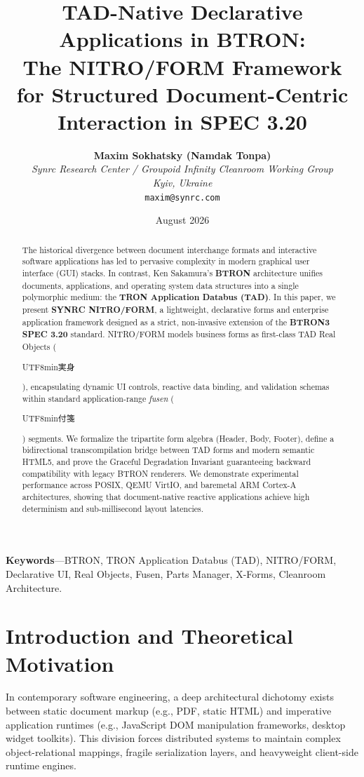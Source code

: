 \documentclass[10pt,journal,compsoc,twocolumn]{article}
\title{\LARGE \textbf{TAD-Native Declarative Applications in BTRON:\\The NITRO/FORM Framework for Structured Document-Centric Interaction in SPEC 3.20}}
\author{
    \textbf{Maxim Sokhatsky (Namdak Tonpa)}\\[0.3em]
    \small \textit{Synrc Research Center / Groupoid Infinity Cleanroom Working Group}\\
    \small \textit{Kyiv, Ukraine}\\
    \small \texttt{maxim@synrc.com}
}
\date{August 2026}
\newcommand{\ja}[1]{\begin{CJK*}{UTF8}{min}#1\end{CJK*}}
\begin{document}
\maketitle

\begin{abstract}
The historical divergence between document interchange formats and interactive software applications has led to pervasive complexity in modern graphical user interface (GUI) stacks. In contrast, Ken Sakamura's \textbf{BTRON} architecture unifies documents, applications, and operating system data structures into a single polymorphic medium: the \textbf{TRON Application Databus (TAD)}. In this paper, we present \textbf{SYNRC NITRO/FORM}, a lightweight, declarative forms and enterprise application framework designed as a strict, non-invasive extension of the \textbf{BTRON3 SPEC 3.20} standard. NITRO/FORM models business forms as first-class TAD Real Objects (\ja{実身}), encapsulating dynamic UI controls, reactive data binding, and validation schemas within standard application-range \emph{fusen} (\ja{付箋}) segments. We formalize the tripartite form algebra (Header, Body, Footer), define a bidirectional transcompilation bridge between TAD forms and modern semantic HTML5, and prove the Graceful Degradation Invariant guaranteeing backward compatibility with legacy BTRON renderers. We demonstrate experimental performance across POSIX, QEMU VirtIO, and baremetal ARM Cortex-A architectures, showing that document-native reactive applications achieve high determinism and sub-millisecond layout latencies.
\end{abstract}

\noindent\textbf{\small Keywords}---BTRON, TRON Application Databus (TAD), NITRO/FORM, Declarative UI, Real Objects, Fusen, Parts Manager, X-Forms, Cleanroom Architecture.

\section{Introduction and Theoretical Motivation}
\label{sec:intro}

In contemporary software engineering, a deep architectural dichotomy exists between static document markup (e.g., PDF, static HTML) and imperative application runtimes (e.g., JavaScript DOM manipulation frameworks, desktop widget toolkits). This division forces distributed systems to maintain complex object-relational mappings, fragile serialization layers, and heavyweight client-side runtime engines.
\end{document}
